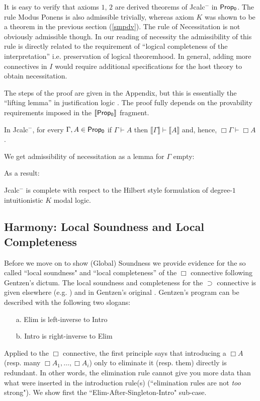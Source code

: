 	It is easy to verify that axioms $1$, $2$ are derived theorems of {\sf Jcalc$^{-}$} in ${\sf Prop_0}$. The rule Modus Ponens is also admissible trivially, whereas axiom $K$  was  
	shown to be a theorem in the previous section (\ref{smpdv}). The rule of Necessitation is not obviously admissible though. In our reading of necessity the
	admissibility of this rule is directly related to the requirement of ``logical completeness of the interpretation'' i.e. preservation of logical theoremhood.  
	In general, adding more connectives in $I$ would require additional specifications for the host theory to obtain necessitation.
	
	The steps of the proof are given in the Appendix, but this is essentially  the ``lifting lemma'' in justification logic \cite{Artemov2001}. 
	The proof fully depends on
	the provability requirements imposed in the $\llbracket{\sf Prop_0}\rrbracket$ fragment.
	\begin{theorem}
		In {\sf Jcalc$^{-}$}, for every  $\Gamma,   A \in {\sf Prop_0}$ if  $\Gamma\vdash A$ then  $\llbracket \Gamma\rrbracket\vdash\llbracket A\rrbracket $ and, hence, $\Box\Gamma \vdash \Box   A$.
	\end{theorem}
	We get admissibility of necessitation as a lemma for $\Gamma$ empty:
		
	As a result:
	\begin{theorem}[Completeness]
		{\sf Jcalc$^{-}$} is complete with respect to the Hilbert style formulation of degree-$1$ intuitionistic $K$ modal logic. 
	\end{theorem}
	
	\subsection{Harmony: Local Soundness and Local Completeness}
	\label{gprinc}
	Before we move on to show (Global) Soundness we provide evidence for the so called ``local soundness" and ``local completeness'' of the $\Box$ connective
	following Gentzen's dictum. The local soundness and completeness for the $\supset$ connective 
	is given elsewhere (e.g. \cite{prawitz10natural}) and in Gentzen's original \cite{gentzen1935untersuchungen}. Gentzen's program can be described with the following two slogans:\begin{itemize} \item[a.] Elim is left-inverse to Intro \item[b.] Intro is right-inverse to Elim\end{itemize}   
	Applied to the $\Box$ connective, the first principle says that introducing a $\Box   A$ (resp. many $\Box A_1, \ldots, \Box A_i$) only to eliminate it (resp. them) directly is redundant. 
	In other words, the elimination rule cannot give you more data than what were inserted in the introduction rule(s)  (``elimination rules are not \textit{too} strong").
	We show first the ``Elim-After-Singleton-Intro" sub-case.
	
